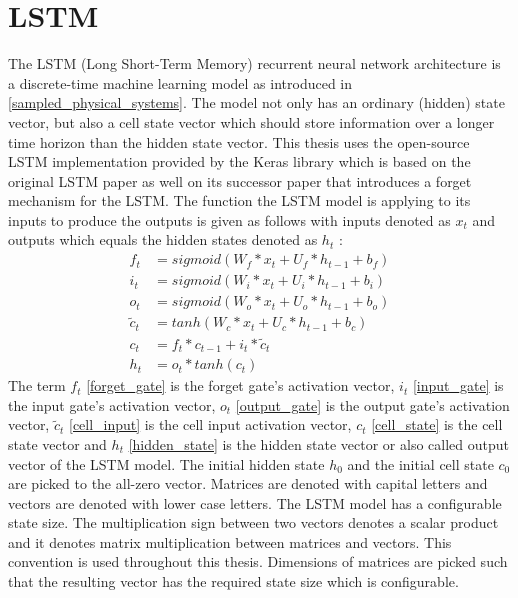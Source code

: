 \documentclass[draft,final]{vutinfth} %
\begin{document}
    \section{LSTM} \label{lstm}
    The LSTM (Long Short-Term Memory) recurrent neural network architecture is a discrete-time machine learning model as introduced in \ref{sampled_physical_systems}.
    The model not only has an ordinary (hidden) state vector, but also a cell state vector which should store information over a longer time horizon than the hidden state vector.
    This thesis uses the open-source LSTM implementation provided by the Keras library \cite{Keras} which is based on the original LSTM paper \cite{LSTM} as well on its successor paper \cite{LSTM_forget} that introduces a forget mechanism for the LSTM.
    The function the LSTM model is applying to its inputs to produce the outputs is given as follows with inputs denoted as $x_t$ and outputs which equals the hidden states denoted as $h_t$ \cite[p. 4-8]{LSTM_forget}:
    \begin{align}
    \label{forget_gate} f_t &= sigmoid(W_f*x_t + U_f*h_{t-1} + b_f) \\
    \label{input_gate} i_t &= sigmoid(W_i*x_t + U_i*h_{t-1} + b_i) \\
    \label{output_gate} o_t &= sigmoid(W_o*x_t + U_o*h_{t-1} + b_o) \\
    \label{cell_input} \tilde{c}_t &= tanh(W_c*x_t + U_c*h_{t-1} + b_c) \\
    \label{cell_state} c_t &= f_t * c_{t-1} + i_t * \tilde{c}_t \\
    \label{hidden_state} h_t &= o_t * tanh(c_t)
    \end{align}
    The term $f_t$ \ref{forget_gate} is the forget gate's activation vector, $i_t$ \ref{input_gate} is the input gate's activation vector, $o_t$ \ref{output_gate} is the output gate's activation vector, $\tilde{c}_t$ \ref{cell_input} is the cell input activation vector, $c_t$ \ref{cell_state} is the cell state vector and $h_t$ \ref{hidden_state} is the hidden state vector or also called output vector of the LSTM model.
    The initial hidden state $h_0$ and the initial cell state $c_0$ are picked to the all-zero vector.
    Matrices are denoted with capital letters and vectors are denoted with lower case letters. 
    The LSTM model has a configurable state size. The multiplication sign between two vectors denotes a scalar product and it denotes matrix multiplication between matrices and vectors.
    This convention is used throughout this thesis.
    Dimensions of matrices are picked such that the resulting vector has the required state size which is configurable.
\end{document}
